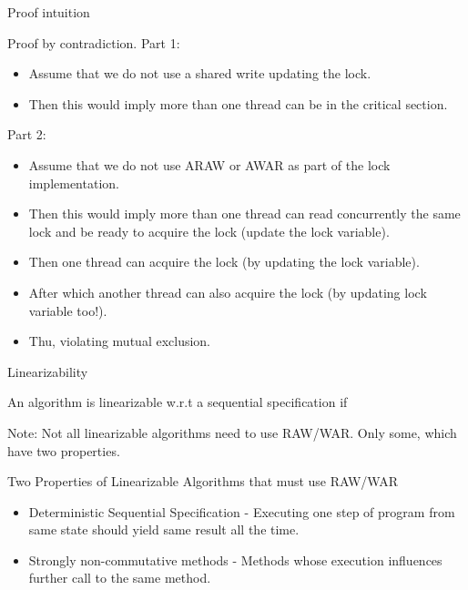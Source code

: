 \documentclass[notes, xcolor=dvipsnames]{beamer}
\begin{document}
    \begin{frame}{Proof intuition}

        Proof by contradiction.
        Part 1:
        \begin{itemize}
            \item Assume that we do not use a shared write updating the lock. 
            \item Then this would imply more than one thread can be in the critical section. 
        \end{itemize}

        Part 2:
        \begin{itemize}
            \item Assume that we do not use ARAW or AWAR as part of the lock implementation. 
            \item Then this would imply more than one thread can read concurrently the same lock and be ready to acquire the lock (update the lock variable).
            \item Then one thread can acquire the lock (by updating the lock variable). 
            \item After which another thread can also acquire the lock (by updating lock variable too!). 
            \item Thu, violating mutual exclusion.
        \end{itemize}

    \end{frame}

    \begin{frame}{Linearizability}

        An algorithm is linearizable w.r.t a sequential specification if
        
        Note: Not all linearizable algorithms need to use RAW/WAR. Only some, which have two properties.

    \end{frame}

    \begin{frame}{Two Properties of Linearizable Algorithms that must use RAW/WAR}
        
        \begin{itemize}
            \item Deterministic Sequential Specification - Executing one step of program from same state should yield same result all the time.
            \item Strongly non-commutative methods - Methods whose execution influences further call to the same method.
        \end{itemize}

    \end{frame}
\end{document}
